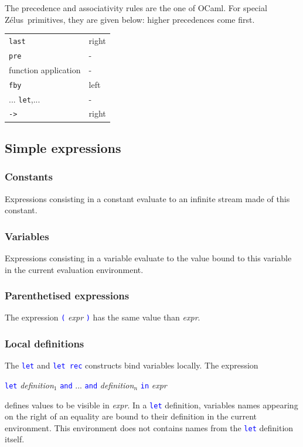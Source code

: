 \documentclass[11pt,titlepage,twoside]{report}
\newcommand{\zelus}{{\sf Z\'elus}}
\newcommand{\ocaml}{{\sf OCaml}}
\newcommand{\Let}{\mbox{{\tt let}}}
\newcommand{\Rec}{\mbox{{\tt rec}}}
\newcommand{\In}{\mbox{{\tt in}}}
\newcommand{\And}{\mbox{{\tt and}}}
\newcommand{\Pre}{\mbox{{\tt pre}}}
\newcommand{\Last}{\mbox{{\tt last}}}
\newcommand{\Fby}{\mbox{{\tt fby}}}
\newcommand{\Minusgreater}{\mbox{{\tt ->}}}
\newcommand{\term}[1]{\textcolor{Blue}{\tt #1}}
\newcommand{\nterm}[1]{\textcolor{BrickRed}{\it #1}}
\newcommand{\term}[1]{{\tt #1}}
\newcommand{\nterm}[1]{{\em #1}}
\begin{document}
The precedence and associativity rules are the one of \ocaml. For
special \zelus\ primitives, they are given below:
higher precedences come first.
\begin{center}
{
\begin{tabular}{|l|l|} \hline
\Last                           & right         \\
\Pre                            & -             \\
function application            & -             \\
\Fby                            & left          \\
...
\Let,...                        & -             \\ 
\Minusgreater                   & right         \\ \hline
\end{tabular}
}
\end{center}

\subsection{Simple expressions\label{simpleexpressions}} %
\subsubsection{Constants} %

Expressions consisting in a constant evaluate to an infinite stream
made of this constant.

\subsubsection{Variables} %

Expressions consisting in a variable evaluate to the value bound to
this variable in the current evaluation environment.

\subsubsection{Parenthetised expressions} %
The expression \term{(} \nterm{expr} \term{)} has the same value than
\nterm{expr}.

\subsubsection{Local definitions} %

The \term{\Let} and \term{\Let\ \Rec} constructs bind variables
locally. The expression 
\begin{center}
  \term{\Let} \nterm{definition}$_1$ \term{\And} ... 
  \term{\And} \nterm{definition}$_n$ \term{\In} \nterm{expr}
\end{center}
defines values to be visible in \nterm{expr}. In a \term{\Let} definition,
variables names appearing on the right of an equality are bound to their definition
in the current environment. This environment does not contains names from
the \term{\Let} definition itself.
\end{document}
